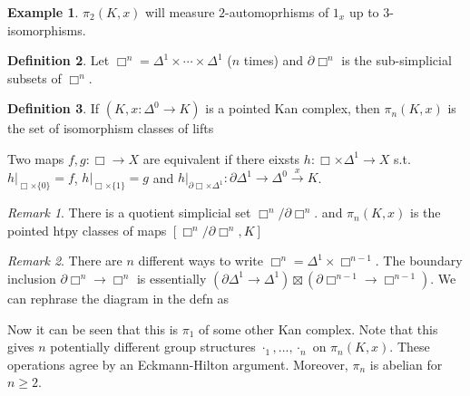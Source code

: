 \documentclass{article}
\theoremstyle{definition}
\newtheorem{defn}{Definition}[section]
\newtheorem{example}[defn]{Example}
\theoremstyle{remark}
\newtheorem{rem}{Remark}
\theoremstyle{plain}
\newcommand{\Hom}{\operatorname{Hom}}
\begin{document}
\begin{example}
    $\pi_2(K,x)$ will measure $2$-automoprhisms of $1_x$ up to $3$-isomorphisms.
\end{example}
\begin{defn}
    Let $\Box^n=\Delta^1\times\cdots\times\Delta^1$ ($n$ times) and $\partial\Box^n$ is the sub-simplicial subsets of $\Box^n$.
\end{defn}
\begin{defn}
    If $(K,x:\Delta^0\to K)$ is a pointed Kan complex, then $\pi_n(K,x)$ is the set of isomorphism classes of lifts
    \begin{center}
    \end{center}
\end{defn}
Two maps $f,g:\Box\to X$ are equivalent if there eixsts $h:\Box\times\Delta^1\to X$ s.t. $h|_{\Box\times\{0\}}=f$, $h|_{\Box\times\{1\}}=g$ and $h|_{\partial\Box\times\Delta^1}:\partial\Delta^1\to\Delta^0\overset{x}{\to}K$.
\begin{rem}
    There is a quotient simplicial set $\Box^n/\partial\Box^n$. and $\pi_n(K,x)$ is the pointed htpy classes of maps $[\Box^n/\partial\Box^n,K]$
\end{rem}
\begin{rem}
    There are $n$ different ways to write $\Box^n=\Delta^1\times\Box^{n-1}$. The boundary inclusion $\partial \Box^n\to\Box^n$ is essentially $(\partial \Delta^1\to\Delta^1)\boxtimes(\partial \Box^{n-1}\to\Box^{n-1})$. We can rephrase the diagram in the defn as
    \begin{center}
    \end{center}
    Now it can be seen that this is $\pi_1$ of some other Kan complex. Note that this gives $n$ potentially different group structures $\cdot_1,...,\cdot_n$ on $\pi_n(K,x)$. These operations agree by an Eckmann-Hilton argument. Moreover, $\pi_n$ is abelian for $n\ge 2$.
\end{rem}
\end{document}
